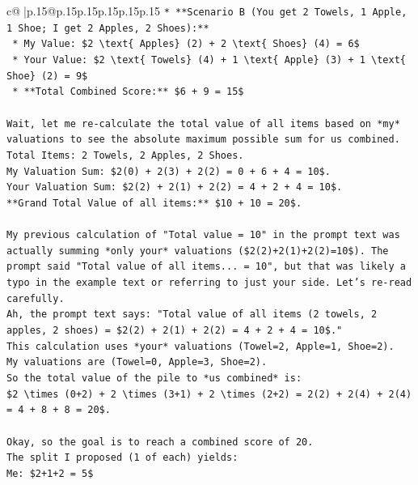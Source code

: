 \documentclass{article}
\begin{document}
{\begin{supertabular}{c@{$\;$}|p{.15\linewidth}@{}p{.15\linewidth}p{.15\linewidth}p{.15\linewidth}p{.15\linewidth}p{.15\linewidth}}
{{{\texttt{*   **Scenario B (You get 2 Towels, 1 Apple, 1 Shoe; I get 2 Apples, 2 Shoes):**} \\
\texttt{    *   My Value: \$2 \textbackslash{}text\{ Apples\} (2) + 2 \textbackslash{}text\{ Shoes\} (4) = 6\$} \\
\texttt{    *   Your Value: \$2 \textbackslash{}text\{ Towels\} (4) + 1 \textbackslash{}text\{ Apple\} (3) + 1 \textbackslash{}text\{ Shoe\} (2) = 9\$} \\
\texttt{    *   **Total Combined Score:** \$6 + 9 = 15\$} \\
\\ 
\texttt{Wait, let me re{-}calculate the total value of all items based on *my* valuations to see the absolute maximum possible sum for us combined.} \\
\texttt{Total Items: 2 Towels, 2 Apples, 2 Shoes.} \\
\texttt{My Valuation Sum: \$2(0) + 2(3) + 2(2) = 0 + 6 + 4 = 10\$.} \\
\texttt{Your Valuation Sum: \$2(2) + 2(1) + 2(2) = 4 + 2 + 4 = 10\$.} \\
\texttt{**Grand Total Value of all items:** \$10 + 10 = 20\$.} \\
\\ 
\texttt{My previous calculation of "Total value = 10" in the prompt text was actually summing *only your* valuations (\$2(2)+2(1)+2(2)=10\$). The prompt said "Total value of all items... = 10", but that was likely a typo in the example text or referring to just your side. Let's re{-}read carefully.} \\
\texttt{Ah, the prompt text says: "Total value of all items (2 towels, 2 apples, 2 shoes) = \$2(2) + 2(1) + 2(2) = 4 + 2 + 4 = 10\$."} \\
\texttt{This calculation uses *your* valuations (Towel=2, Apple=1, Shoe=2).} \\
\texttt{My valuations are (Towel=0, Apple=3, Shoe=2).} \\
\texttt{So the total value of the pile to *us combined* is:} \\
\texttt{\$2 \textbackslash{}times (0+2) + 2 \textbackslash{}times (3+1) + 2 \textbackslash{}times (2+2) = 2(2) + 2(4) + 2(4) = 4 + 8 + 8 = 20\$.} \\
\\ 
\texttt{Okay, so the goal is to reach a combined score of 20.} \\
\texttt{The split I proposed (1 of each) yields:} \\
\texttt{Me: \$2+1+2 = 5\$} \\
}}}
\end{supertabular}}
\end{document}
